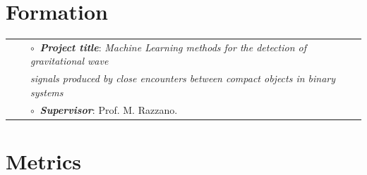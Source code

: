 
\section{Formation}

\vspace{-0.1cm}
\begin{tabular}{rcl}
&\hspace{0.4cm} &$\circ\;\;${\textbf{\textit{Project title}}}: \textit{Machine Learning methods for the detection of gravitational wave}\\&\hspace{0.4cm} &
\textit{\phantom{Project title title}signals produced by close encounters between compact objects in binary systems}\\
&\hspace{0.4cm} &$\circ\;\;${\textbf{\textit{Supervisor}}}:  Prof. M. Razzano.\\
\end{tabular}
\vspace{0.2cm}


\section{Metrics}




\vspace{0.2cm}






\vspace{0.2cm}





